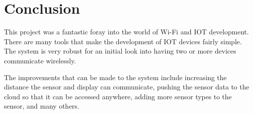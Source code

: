 \documentclass[onecolumn, 12pt]{IEEEConf}
\begin{document}
    \section{Conclusion}
        This project was a fantastic foray into the world of Wi-Fi and IOT development.
        There are many tools that make the development of IOT devices fairly simple.
        The system is very robust for an initial look into having two or more devices communicate wirelessly.

        The improvements that can be made to the system include increasing the distance the sensor and display can communicate,
        pushing the sensor data to the cloud so that it can be accessed anywhere, adding more sensor types to the sensor, and many others.

    
    
\end{document}

